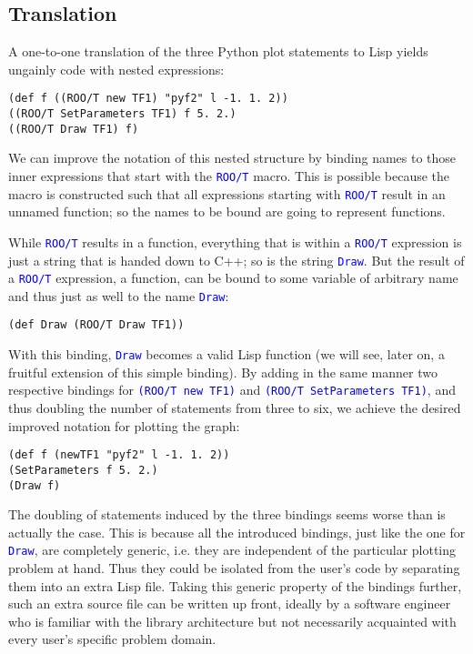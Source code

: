 \documentclass[twocolumn]{article}
\begin{document}
\subsection{Translation}
A one-to-one translation of the three Python plot statements to Lisp yields ungainly code with nested expressions:
{\color{blue}\begin{verbatim}
(def f ((ROO/T new TF1) "pyf2" l -1. 1. 2))
((ROO/T SetParameters TF1) f 5. 2.)
((ROO/T Draw TF1) f)
\end{verbatim}}
We can improve the notation of this nested structure by binding names to those inner expressions that start with the \texttt{\textcolor{blue}{ROO/T}} macro. This is possible because the macro is constructed such that all expressions starting with \texttt{\textcolor{blue}{ROO/T}} result in an unnamed function; so the names to be bound are going to represent functions.

While \texttt{\textcolor{blue}{ROO/T}} results in a function, everything that is within a \texttt{\textcolor{blue}{ROO/T}} expression is just a string that is handed down to C++; so is the string \texttt{\textcolor{blue}{Draw}}. But the result of a \texttt{\textcolor{blue}{ROO/T}} expression, a function, can be bound to some variable of arbitrary name and thus just as well to the name \texttt{\textcolor{blue}{Draw}}:
{\color{blue}\begin{verbatim}
(def Draw (ROO/T Draw TF1))
\end{verbatim}}
With this binding, \texttt{\textcolor{blue}{Draw}} becomes a valid Lisp function (we will see, later on, a fruitful extension of this simple binding). By adding in the same manner two respective bindings for \texttt{\textcolor{blue}{(ROO/T new TF1)}} and \texttt{\textcolor{blue}{(ROO/T SetParameters TF1)}}, and thus doubling the number of statements from three to six, we achieve the desired improved notation for plotting the graph:
{\color{blue}\begin{verbatim}
(def f (newTF1 "pyf2" l -1. 1. 2))
(SetParameters f 5. 2.)
(Draw f)
\end{verbatim}}
The doubling of statements induced by the three bindings seems worse than is actually the case. This is because all the introduced bindings, just like the one for \texttt{\textcolor{blue}{Draw}}, are completely generic, i.e. they are independent of the particular plotting problem at hand. Thus they could be isolated from the user’s code by separating them into an extra Lisp file. Taking this generic property of the bindings further, such an extra source file can be written up front, ideally by a software engineer who is familiar with the library architecture but not necessarily acquainted with every user’s specific problem domain.
\end{document}
